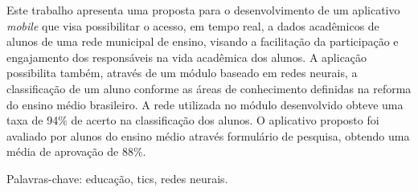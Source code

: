 \begin{resumo}
    Este trabalho apresenta uma proposta para o desenvolvimento de um aplicativo \textit{mobile} que visa possibilitar o acesso, em tempo real, a dados acadêmicos de alunos de uma rede municipal de ensino, visando a facilitação da participação e engajamento dos responsáveis na vida acadêmica dos alunos. A aplicação possibilita também, através de um módulo baseado em redes neurais, a classificação de um aluno conforme as áreas de conhecimento definidas na reforma do ensino médio brasileiro. A rede utilizada no módulo desenvolvido obteve uma taxa de 94\% de acerto na classificação dos alunos. O aplicativo proposto foi avaliado por alunos do ensino médio através formulário de pesquisa, obtendo uma média de aprovação de 88\%.
    
    Palavras-chave: educação, tics, redes neurais.
\end{resumo}